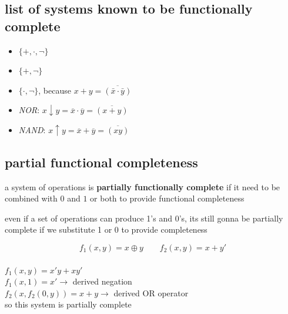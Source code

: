 \documentclass[a4paper,12pt]{article}
\begin{document}
\subsection{list of systems known to be functionally complete}
\label{sec:org8ef39a2}
\begin{itemize}
\item \(\{+, \cdot, \lnot\}\)\\
\item \(\{+, \lnot\}\)\\
\item \(\{\cdot, \lnot\}\), because \(x + y = \overline{(\bar{x} \cdot \bar{y})}\)\\
\item \emph{NOR}: \(x \downarrow y = \overline{x} \cdot \overline{y} = \overline{(x + y)}\)\\
\item \emph{NAND}: \(x \uparrow y = \overline{x} + \overline{y} = \overline{(xy)}\)\\
\end{itemize}
\subsection{partial functional completeness}
\label{sec:org62859a2}
\begin{definition}
a system of operations is \textbf{partially functionally complete} if it need to be combined with \(0\) and \(1\) or both to provide functional completeness\\
\begin{note}
even if a set of operations can produce 1's and 0's, its still gonna be partially complete if we substitute 1 or 0 to provide completeness\\
\begin{my_example}
\[
f_1(x,y) = x \oplus y \qquad f_2(x,y) = x + y'
\]\\
\(f_1(x,y)=x'y+xy'\)\\
\(f_1(x,1)=x' \longrightarrow\) derived negation\\
\(f_2(x, f_2(0, y)) = x+y \longrightarrow\) derived OR operator\\
so this system is partially complete\\
\end{my_example}
\end{note}
\end{definition}
\end{document}
